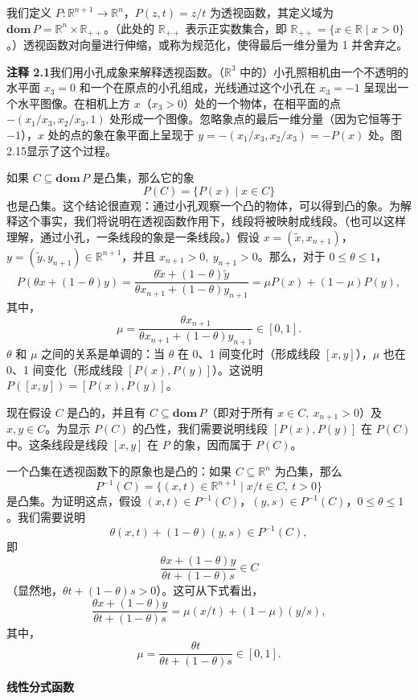 \documentclass[UTF8,12pt,a4paper,fontset=fandol]{ctexart}
\begin{document}
我们定义 $P:\mathbb{R}^{n+1}\to\mathbb{R}^n$，$P(z,t)=z/t$ 为透视函数，其定义域为 $\mathbf{dom}\,P=\mathbb{R}^n\times\mathbb{R}_{++}$。（此处的 $\mathbb{R}_{++}$ 表示正实数集合，即 $\mathbb{R}_{++}=\{x\in\mathbb{R}\mid x>0\}$。）透视函数对向量进行伸缩，或称为规范化，使得最后一维分量为 1 并舍弃之。

\noindent\textbf{注释 2.1}\quad 我们用小孔成象来解释透视函数。（$\mathbb{R}^3$ 中的）小孔照相机由一个不透明的水平面 $x_3=0$ 和一个在原点的小孔组成，光线通过这个小孔在 $x_3=-1$ 呈现出一个水平图像。在相机上方 $x$（$x_3>0$）处的一个物体，在相平面的点 $-(x_1/x_3,x_2/x_3,1)$ 处形成一个图像。忽略象点的最后一维分量（因为它恒等于 $-1$），$x$ 处的点的象在象平面上呈现于 $y=-(x_1/x_3,x_2/x_3)=-P(x)$ 处。图2.15显示了这个过程。

如果 $C\subseteq\mathbf{dom}\,P$ 是凸集，那么它的象
\[
  P(C)=\{P(x)\mid x\in C\}
\]
也是凸集。这个结论很直观：通过小孔观察一个凸的物体，可以得到凸的象。为解释这个事实，我们将说明在透视函数作用下，线段将被映射成线段。（也可以这样理解，通过小孔，一条线段的象是一条线段。）假设 $x=(\tilde{x},x_{n+1})$，$y=(\tilde{y},y_{n+1})\in\mathbb{R}^{n+1}$，并且 $x_{n+1}>0,\ y_{n+1}>0$。那么，对于 $0\le\theta\le 1$，
\[
  P(\theta x+(1-\theta)y)
  =
  \frac{\theta\tilde{x}+(1-\theta)\tilde{y}}{\theta x_{n+1}+(1-\theta)y_{n+1}}
  =\mu P(x)+(1-\mu)P(y),
\]
其中，
\[
  \mu=\frac{\theta x_{n+1}}{\theta x_{n+1}+(1-\theta)y_{n+1}}\in[0,1].
\]
$\theta$ 和 $\mu$ 之间的关系是单调的：当 $\theta$ 在 0、1 间变化时（形成线段 $[x,y]$），$\mu$ 也在 0、1 间变化（形成线段 $[P(x),P(y)]$）。这说明 $P([x,y])=[P(x),P(y)]$。

现在假设 $C$ 是凸的，并且有 $C\subseteq\mathbf{dom}\,P$（即对于所有 $x\in C,\ x_{n+1}>0$）及 $x,y\in C$。为显示 $P(C)$ 的凸性，我们需要说明线段 $[P(x),P(y)]$ 在 $P(C)$ 中。这条线段是线段 $[x,y]$ 在 $P$ 的象，因而属于 $P(C)$。

一个凸集在透视函数下的原象也是凸的：如果 $C\subseteq\mathbb{R}^n$ 为凸集，那么
\[
  P^{-1}(C)=\{(x,t)\in\mathbb{R}^{n+1}\mid x/t\in C,\ t>0\}
\]
是凸集。为证明这点，假设 $(x,t)\in P^{-1}(C)$，$(y,s)\in P^{-1}(C)$，$0\le\theta\le 1$。我们需要说明
\[
  \theta(x,t)+(1-\theta)(y,s)\in P^{-1}(C),
\]
即
\[
  \frac{\theta x+(1-\theta)y}{\theta t+(1-\theta)s}\in C
\]
（显然地，$\theta t+(1-\theta)s>0$）。这可从下式看出，
\[
  \frac{\theta x+(1-\theta)y}{\theta t+(1-\theta)s}
  =\mu(x/t)+(1-\mu)(y/s),
\]
其中，
\[
  \mu=\frac{\theta t}{\theta t+(1-\theta)s}\in[0,1].
\]

\noindent\textbf{线性分式函数}
\end{document}
